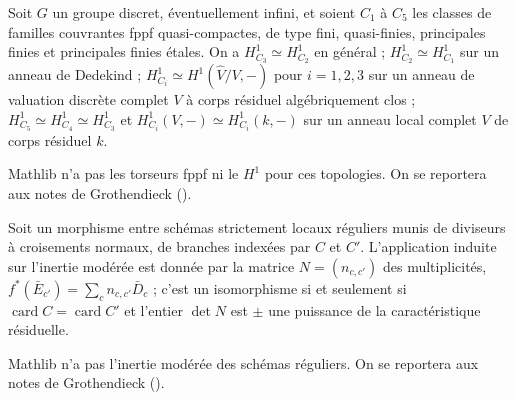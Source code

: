 \begin{encadre}
\begin{theoreme*}\nonverifie
Soit $G$ un groupe discret, éventuellement infini, et soient $C_1$ à $C_5$ les classes de familles couvrantes fppf quasi-compactes, de type fini, quasi-finies, principales finies et principales finies étales. On a $H^1_{C_3} \simeq H^1_{C_2}$ en général ; $H^1_{C_2} \simeq H^1_{C_1}$ sur un anneau de Dedekind ; $H^1_{C_i} \simeq H^1(\hat V/V, -)$ pour $i = 1, 2, 3$ sur un anneau de valuation discrète complet $V$ à corps résiduel algébriquement clos ; $H^1_{C_5} \simeq H^1_{C_4} \simeq H^1_{C_3}$ et $H^1_{C_i}(V, -) \simeq H^1_{C_i}(k, -)$ sur un anneau local complet $V$ de corps résiduel $k$.
\end{theoreme*}
\end{encadre}
{\small Mathlib n'a pas les torseurs fppf ni le $H^1$ pour ces topologies. On se reportera aux notes de Grothendieck ().\par}

\begin{encadre}
\begin{theoreme*}\nonverifie
Soit un morphisme entre schémas strictement locaux réguliers munis de diviseurs à croisements normaux, de branches indexées par $C$ et $C'$. L'application induite sur l'inertie modérée est donnée par la matrice $N = (n_{c,c'})$ des multiplicités, $f^*(\bar E_{c'}) = \sum_c n_{c,c'} \bar D_c$ ; c'est un isomorphisme si et seulement si $\operatorname{card} C = \operatorname{card} C'$ et l'entier $\det N$ est $\pm$ une puissance de la caractéristique résiduelle.
\end{theoreme*}
\end{encadre}
{\small Mathlib n'a pas l'inertie modérée des schémas réguliers. On se reportera aux notes de Grothendieck ().\par}

